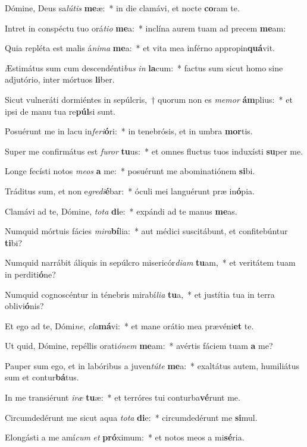 \item Dómine, Deus sa\textit{lú}\textit{tis} \textbf{me}æ:~* in die clamávi, et nocte \textbf{co}ram te.
\item Intret in conspéctu tuo orá\textit{ti}\textit{o} \textbf{me}a:~* inclína aurem tuam ad precem \textbf{me}am:
\item Quia repléta est malis á\textit{ni}\textit{ma} \textbf{me}a:~* et vita mea inférno appropin\textbf{quá}vit.
\item Æstimátus sum cum descendénti\textit{bus} \textit{in} \textbf{la}cum:~* factus sum sicut homo sine adjutório, inter mórtuos \textbf{li}ber.
\item Sicut vulneráti dormiéntes in sepúlcris,~† quorum non es \textit{me}\textit{mor} \textbf{ám}plius:~* et ipsi de manu tua re\textbf{púl}si sunt.
\item Posuérunt me in lacu in\textit{fe}\textit{ri}\textbf{ó}ri:~* in tenebrósis, et in umbra \textbf{mor}tis.
\item Super me confirmátus est \textit{fu}\textit{ror} \textbf{tu}us:~* et omnes fluctus tuos induxísti \textbf{su}per me.
\item Longe fecísti notos \textit{me}\textit{os} \textbf{a} me:~* posuérunt me abominatiónem \textbf{si}bi.
\item Tráditus sum, et non e\textit{gre}\textit{di}\textbf{é}bar:~* óculi mei languérunt præ in\textbf{ó}pia.
\item Clamávi ad te, Dómine, \textit{to}\textit{ta} \textbf{di}e:~* expándi ad te manus \textbf{me}as.
\item Numquid mórtuis fácies \textit{mi}\textit{ra}\textbf{bí}lia:~* aut médici suscitábunt, et confitebúntur \textbf{ti}bi?
\item Numquid narrábit áliquis in sepúlcro misericór\textit{di}\textit{am} \textbf{tu}am,~* et veritátem tuam in perditi\textbf{ó}ne?
\item Numquid cognoscéntur in ténebris mirabí\textit{li}\textit{a} \textbf{tu}a,~* et justítia tua in terra oblivi\textbf{ó}nis?
\item Et ego ad te, Dómi\textit{ne}, \textit{cla}\textbf{má}vi:~* et mane orátio mea prævéni\textbf{et} te.
\item Ut quid, Dómine, repéllis orati\textit{ó}\textit{nem} \textbf{me}am:~* avértis fáciem tuam \textbf{a} me?
\item Pauper sum ego, et in labóribus a juven\textit{tú}\textit{te} \textbf{me}a:~* exaltátus autem, humiliátus sum et contur\textbf{bá}tus.
\item In me transiérunt \textit{i}\textit{ræ} \textbf{tu}æ:~* et terróres tui conturba\textbf{vé}runt me.
\item Circumdedérunt me sicut aqua \textit{to}\textit{ta} \textbf{di}e:~* circumdedérunt me \textbf{si}mul.
\item Elongásti a me amí\textit{cum} \textit{et} \textbf{pró}ximum:~* et notos meos a mi\textbf{sé}ria.
